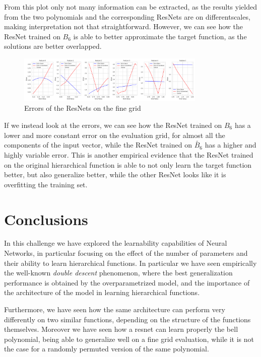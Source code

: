 \documentclass[a4paper, 10pt]{article}
\begin{document}
From this plot only not many information can be extracted, as the results yielded from the two polynomials and the corresponding ResNets are on differentscales, 
making interpretation not that straightforward. However, we can see how the ResNet trained on $B_6$ is able to better approximate the target function, as the
solutions are better overlapped.

\begin{figure}[h]
    \centering
    \includegraphics[width=0.8\textwidth]{images/errors_exB.png}
    \caption{Errors of the ResNets on the fine grid}
    \label{fig:errors_exB}
\end{figure}

If we instead look at the errors, we can see how the ResNet trained on $B_6$ has a lower and more constant error on the evaluation grid, for almost all the components
of the input vector, while the ResNet trained on $\tilde{B_6}$ has a higher and highly variable error. This is another empirical evidence that the ResNet trained
on the original hierarchical function is able to not only learn the target function better, but also generalize better, while the other ResNet looks like it is
overfitting the training set.

\section{Conclusions}
In this challenge we have explored the learnability capabilities of Neural Networks, in particular focusing on the effect of the number of parameters and their ability 
to learn hierarchical functions. In particular we have seen empirically the well-known \textit{double descent} phenomenon, where the best generalization performance
is obtained by the overparametrized model, and the importance of the architecture of the model in learning hierarchical functions.

Furthermore, we have seen how the same architecture can perform very differently on two similar functions, depending on the structure of the functions themselves.
Moreover we have seen how a resnet can learn properly the bell polynomial, being able to generalize well on a fine grid evaluation, while it is not the case for a
randomly permuted version of the same polynomial.
\end{document}
